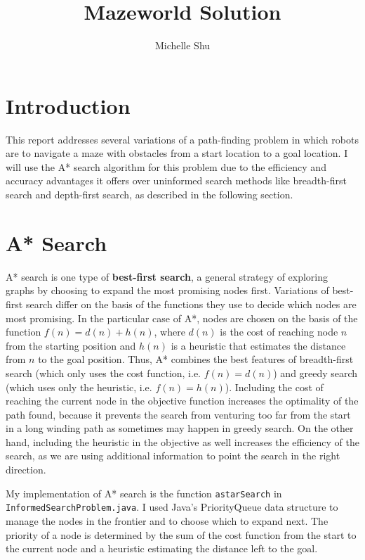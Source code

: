 \documentclass{article}
\title{Mazeworld Solution}
\author{Michelle Shu}
\begin{document}
\maketitle

\section{Introduction}

This report addresses several variations of a path-finding problem in which robots are to navigate a maze with obstacles from a start location to a goal location. I will use the A* search algorithm for this problem due to the efficiency and accuracy advantages it offers over uninformed search methods like breadth-first search and depth-first search, as described in the following section.

\section{A* Search}

A* search is one type of {\bf best-first search}, a general strategy of exploring graphs by choosing to expand the most promising nodes first. Variations of best-first search differ on the basis of the functions they use to decide which nodes are most promising. In the particular case of A*, nodes are chosen on the basis of the function $f(n) = d(n) + h(n)$, where $d(n)$ is the cost of reaching node $n$ from the starting position and $h(n)$ is a heuristic that estimates the distance from $n$ to the goal position. Thus, A* combines the best features of breadth-first search (which only uses the cost function, i.e. $f(n) = d(n)$) and greedy search (which uses only the heuristic, i.e. $f(n) = h(n)$). Including the cost of reaching the current node in the objective function increases the optimality of the path found, because it prevents the search from venturing too far from the start in a long winding path as sometimes may happen in greedy search. On the other hand, including the heuristic in the objective as well increases the efficiency of the search, as we are using additional information to point the search in the right direction.

My implementation of A* search is the function \verb`astarSearch` in \verb`InformedSearchProblem.java`. I used Java's PriorityQueue data structure to manage the nodes in the frontier and to choose which to expand next. The priority of a node is determined by the sum of the cost function from the start to the current node and a heuristic estimating the distance left to the goal.
\end{document}
